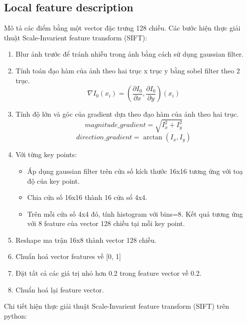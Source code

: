 \documentclass[11pt]{article}
\begin{document}
\subsection*{Local feature description}
Mô tả các điểm bằng một vector đặc trưng 128 chiều. Các bước hiện thực giải thuật Scale-Invarient feature transform (SIFT):
\begin{enumerate}
    \item Blur ảnh trước để tránh nhiễu trong ảnh bằng cách sử dụng gaussian filter.
    \item Tính toán đạo hàm của ảnh theo hai trục x trục y bằng sobel filter theo 2 trục.
        \begin{equation*}
            \nabla I_0(x_i) = (\frac{\partial I_0}{\partial x}, \frac{\partial I_0}{\partial y})(x_i)
        \end{equation*}
    \item Tính độ lớn và góc của gradient dựa theo đạo hàm của ảnh theo hai trục.
        \begin{equation*}
            magnitude\_gradient = \sqrt{I_x^2 + I_y^2}
        \end{equation*}
        \begin{equation*}
            direction\_gradient = \arctan{(I_x, I_y)}
        \end{equation*}
    \item Với từng key points:
        \begin{itemize}
            \item Áp dụng gaussian filter trên cửa số kích thước 16x16 tương ứng với toạ độ của key point.
            \item Chia cửa số 16x16 thành 16 cửa sổ 4x4.
            \item Trên mỗi cửa số 4x4 đó, tính histogram với bins=8. Kết quả tương ứng với 8 feature của vector 128 chiều tại mỗi key point.
        \end{itemize}
    \item Reshape ma trận 16x8 thành vector 128 chiều.
    \item Chuẩn hoá vector features về [0, 1]
    \item Đặt tất cả các giá trị nhỏ hơn 0.2 trong feature vector về 0.2.
    \item Chuẩn hoá lại feature vector.
\end{enumerate}

Chi tiết hiện thực giải thuật Scale-Invarient feature transform (SIFT) trên python:
\end{document}
